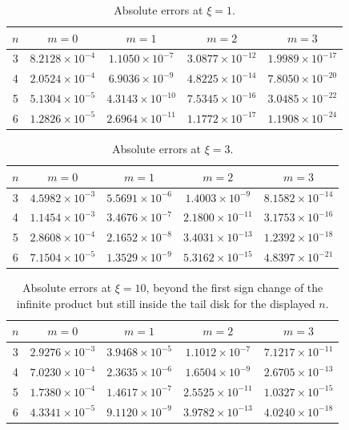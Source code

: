 \documentclass[11pt,oneside]{article}
\numberwithin{equation}{section}
\theoremstyle{definition}
\theoremstyle{remark}
\begin{document}
\begin{table}[ht]
\centering
\caption{Absolute errors at \(\xi=1\).}
\label{p2:tab:error1}
\begin{tabular}{ccccc}
\toprule
\(n\)&\(m=0\)&\(m=1\)&\(m=2\)&\(m=3\)\\
\midrule
3 & \(8.2128\!\times10^{-4}\) & \(1.1050\!\times10^{-7}\) & \(3.0877\!\times10^{-12}\) & \(1.9989\!\times10^{-17}\)\\
4 & \(2.0524\!\times10^{-4}\) & \(6.9036\!\times10^{-9}\) & \(4.8225\!\times10^{-14}\) & \(7.8050\!\times10^{-20}\)\\
5 & \(5.1304\!\times10^{-5}\) & \(4.3143\!\times10^{-10}\) & \(7.5345\!\times10^{-16}\) & \(3.0485\!\times10^{-22}\)\\
6 & \(1.2826\!\times10^{-5}\) & \(2.6964\!\times10^{-11}\) & \(1.1772\!\times10^{-17}\) & \(1.1908\!\times10^{-24}\)\\
\bottomrule
\end{tabular}
\end{table}

\begin{table}[ht]
\centering
\caption{Absolute errors at \(\xi=3\).}
\label{p2:tab:error3}
\begin{tabular}{ccccc}
\toprule
\(n\)&\(m=0\)&\(m=1\)&\(m=2\)&\(m=3\)\\
\midrule
3 & \(4.5982\!\times10^{-3}\) & \(5.5691\!\times10^{-6}\) & \(1.4003\!\times10^{-9}\) & \(8.1582\!\times10^{-14}\)\\
4 & \(1.1454\!\times10^{-3}\) & \(3.4676\!\times10^{-7}\) & \(2.1800\!\times10^{-11}\) & \(3.1753\!\times10^{-16}\)\\
5 & \(2.8608\!\times10^{-4}\) & \(2.1652\!\times10^{-8}\) & \(3.4031\!\times10^{-13}\) & \(1.2392\!\times10^{-18}\)\\
6 & \(7.1504\!\times10^{-5}\) & \(1.3529\!\times10^{-9}\) & \(5.3162\!\times10^{-15}\) & \(4.8397\!\times10^{-21}\)\\
\bottomrule
\end{tabular}
\end{table}

\begin{table}[ht]
\centering
\caption{Absolute errors at \(\xi=10\), beyond the first sign change of the
infinite product but still inside the tail disk for the displayed \(n\).}
\label{p2:tab:error10}
\begin{tabular}{ccccc}
\toprule
\(n\)&\(m=0\)&\(m=1\)&\(m=2\)&\(m=3\)\\
\midrule
3 & \(2.9276\!\times10^{-3}\) & \(3.9468\!\times10^{-5}\) & \(1.1012\!\times10^{-7}\) & \(7.1217\!\times10^{-11}\)\\
4 & \(7.0230\!\times10^{-4}\) & \(2.3635\!\times10^{-6}\) & \(1.6504\!\times10^{-9}\) & \(2.6705\!\times10^{-13}\)\\
5 & \(1.7380\!\times10^{-4}\) & \(1.4617\!\times10^{-7}\) & \(2.5525\!\times10^{-11}\) & \(1.0327\!\times10^{-15}\)\\
6 & \(4.3341\!\times10^{-5}\) & \(9.1120\!\times10^{-9}\) & \(3.9782\!\times10^{-13}\) & \(4.0240\!\times10^{-18}\)\\
\bottomrule
\end{tabular}
\end{table}
\end{document}
